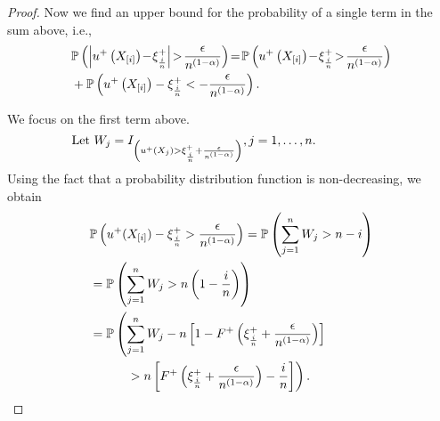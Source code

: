 \begin{proof}
Now we find an upper bound for the probability of a single term in the sum above, i.e.,
\begin{align*}
& \Prob{ \left | u^+\left(X_{[i]}\right)\! -\! \xi^+_{\frac{i}{n}} \right | \!>\! \frac {\epsilon} {n^{\left(1-\alpha\right)}}}  
 \!=\! \Prob{
    u^+\left(X_{[i]}\right) \!-\! \xi^+_{\frac{i}{n}} \!>\! \frac {\epsilon} {n^{\left(1-\alpha\right)}}}\\
	&	+ \Prob{ u^+\left(X_{[i]}\right) -
    \xi^+_{\frac{i}{n}} < - \frac {\epsilon} {n^{\left(1-\alpha\right)}}}.
\end{align*} 

We focus on the first term above.
$$\hspace{-6em}\text{Let } W_j = I_{\left(u^+(X_j) > \xi^+_{\frac{i}{n}} + \frac{\epsilon}{n^{(1-\alpha)}}\right)}, j=1, \ldots,n.$$ Using the fact that a probability distribution function is non-decreasing, we obtain 
\begin{align*}
& \mathbb{P}\left(  u^+(X_{[i]}) - \xi^+_{\frac{i}{n}} > \frac {\epsilon}{n^{(1-\alpha)}} \right) =\mathbb{P}\left(  \sum _{j=1}^{n} W_j > n - i \right)  \\
& = \mathbb{P}\left(  \sum _{j=1}^{n} W_j > n\left(1-\frac{i}{n}\right) \right) \\ 
& = \mathbb{P} \left( \sum _{j=1}^{n} W_j - n  \left[1-F^{+}\left(\xi^+_{\frac{i}{n}}
+\frac{\epsilon}{n^{(1-\alpha)}}\right)\right] \right. \\
&\left.\quad\qquad> n  \left[F^{+}\left(\xi^+_{\frac{i}{n}} +\frac{\epsilon}{n^{(1-\alpha)}}\right)
- \frac{i}{n}\right]\right).
\end{align*}


\end{proof}
